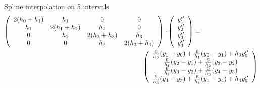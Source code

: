 \begin{example}{Spline interpolation on 5 intervals}
	\begin{eqnarray*}
		\lefteqn{\left(
		\begin{array}{cccc}
			2(h_0+h_1)&h_1&0&0\\
			h_1&2(h_1+h_2)&h_2&0\\
			0&h_2&2(h_2+h_3)&h_3\\
			0&0&h_3&2(h_3+h_4)
		\end{array}
		\right)\cdot
		\left(
		\begin{array}{c}
			y^{\prime\prime}_1\\
			y^{\prime\prime}_2\\
			y^{\prime\prime}_3\\
			y^{\prime\prime}_4
		\end{array}
		\right)
		=}\hspace{7cm}\\
		&&\left(
		\begin{array}{c}
			\frac{6}{h_0}(y_1-y_0)+\frac{6}{h_1}(y_2-y_1)+h_0y_0^{\prime\prime}\\
			\frac{6}{h_1}(y_2-y_1)+\frac{6}{h_2}(y_3-y_2)\\
			\frac{6}{h_2}(y_3-y_2)+\frac{6}{h_3}(y_4-y_3)\\
			\frac{6}{h_3}(y_4-y_3)+\frac{6}{h_4}(y_5-y_4)+h_4y_5^{\prime\prime}
		\end{array}
		\right)
	\end{eqnarray*}
\end{example}

